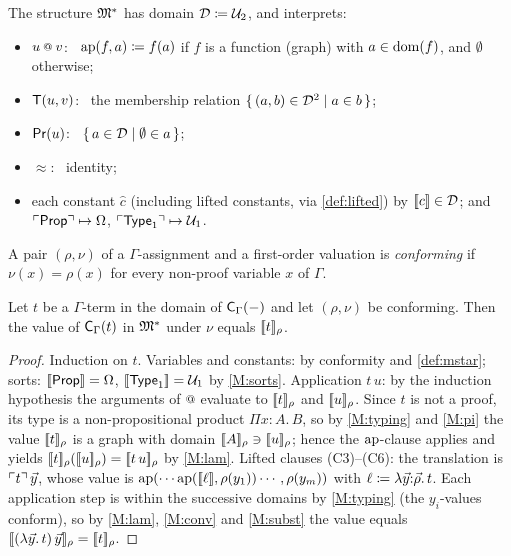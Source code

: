 \begin{definition}
\label{def:mstar}
The structure $\mathfrak{M}^{*}$ has domain $\mathcal{D} \coloneqq \mathcal{U}_2$, and
interprets:
\begin{itemize}
\item $u \app v$: \ $\mathrm{ap}(f, a) \coloneqq f(a)$ if $f$ is a function
  (graph) with $a \in \mathrm{dom}(f)$, and $\emptyset$ otherwise;
\item $\mathsf{T}(u, v)$: \ the membership relation
  $\{\,(a,b) \in \mathcal{D}^2 \mid a \in b\,\}$;
\item $\mathsf{Pr}(u)$: \ $\{\,a \in \mathcal{D} \mid \emptyset \in a\,\}$;
\item $\approx$: \ identity;
\item each constant $\hat{c}$ (including lifted constants, via
  \cref{def:lifted}) by $[\![ c ]\!] \in \mathcal{D}$; and
  $\ulcorner \mathsf{Prop} \urcorner \mapsto \Omega$, $\ulcorner \mathsf{Type}_1 \urcorner \mapsto \mathcal{U}_1$.
\end{itemize}
A pair $(\rho, \nu)$ of a $\Gamma$-assignment and a first-order
valuation is \emph{conforming} if $\nu(x) = \rho(x)$ for every
non-proof variable $x$ of $\Gamma$.
\end{definition}

\begin{lemma}[Compositionality]
\label{lem:compositionality}
Let $t$ be a $\Gamma$-term in the domain of $\mathsf{C}_{\Gamma}(-)$ and
let $(\rho, \nu)$ be conforming.  Then the value of
$\mathsf{C}_{\Gamma}(t)$ in $\mathfrak{M}^{*}$ under $\nu$ equals $[\![ t ]\!]_{\rho}$.
\end{lemma}

\begin{proof}
Induction on $t$.  Variables and constants: by conformity and
\cref{def:mstar}; sorts: $[\![ \mathsf{Prop} ]\!] = \Omega$, $[\![ \mathsf{Type}_1 ]\!] =
\mathcal{U}_1$ by \ref{M:sorts}.  Application $t\,u$: by the induction
hypothesis the arguments of $\app$ evaluate to $[\![ t ]\!]_{\rho}$ and
$[\![ u ]\!]_{\rho}$.  Since $t$ is not a proof, its type is a
non-propositional product $\Pi x{:}A.\,B$, so by \ref{M:typing} and
\ref{M:pi} the value $[\![ t ]\!]_{\rho}$ is a graph with domain
$[\![ A ]\!]_{\rho} \ni [\![ u ]\!]_{\rho}$; hence the $\mathrm{ap}$-clause applies
and yields $[\![ t ]\!]_{\rho}([\![ u ]\!]_{\rho}) = [\![ t\,u ]\!]_{\rho}$ by
\ref{M:lam}.  Lifted clauses (C3)--(C6): the translation is
$\ulcorner t \urcorner\,\vec{y}$, whose value is
$\mathrm{ap}(\cdots\mathrm{ap}([\![ \ell ]\!], \rho(y_1))\cdots, \rho(y_m))$ with $\ell
\coloneqq \lambda\vec{y}{:}\vec{\rho}.\,t$.  Each application step
is within the successive domains by \ref{M:typing} (the
$y_i$-values conform), so by \ref{M:lam}, \ref{M:conv} and
\ref{M:subst} the value equals
$[\![ (\lambda\vec{y}.\,t)\,\vec{y} ]\!]_{\rho} = [\![ t ]\!]_{\rho}$.
\end{proof}

